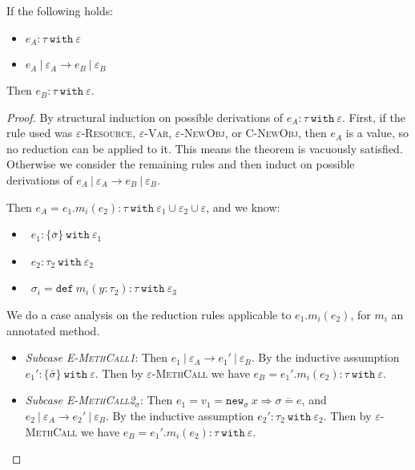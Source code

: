 \documentclass{llncs}
\newcommand{\keywadj}[1]{\mathtt{#1}}
\newcommand{\keyw}[1]{\keywadj{#1}~}
\newcommand{\pcase}[1][]{
  \if\relax\detokenize{#1}\relax
    \def\thiscase{}
  \else
    \def\thiscase{~#1}
  \fi
  \item
}
\begin{document}
\begin{theorem}[Preservation]
If the following holds:
\begin{itemize}
	\item $e_A : \tau~\keyw{with} \varepsilon$
	\item $e_A~|~\varepsilon_A \longrightarrow e_B~|~\varepsilon_B$
\end{itemize}

\noindent
Then $e_B : \tau~\keyw{with} \varepsilon$.
\end{theorem}

\begin{proof}
By structural induction on possible derivations of $e_A : \tau~\keyw{with} \varepsilon$. First, if the rule used was \textsc{$\varepsilon$-Resource}, \textsc{$\varepsilon$-Var}, \textsc{$\varepsilon$-NewObj}, or \textsc{C-NewObj}, then $e_A$ is a value, so no reduction can be applied to it. This means the theorem is vacuously satisfied. Otherwise we consider the remaining rules and then induct on possible derivations of $e_A~|~\varepsilon_A \longrightarrow e_B~|~\varepsilon_B$.

\begin{pcases}

\pcase[\textsc{$\varepsilon$-MethCall$_{\sigma}$}]
Then $e_A = e_1.m_i(e_2) : \tau~\keyw{with} \varepsilon_1 \cup \varepsilon_2 \cup \varepsilon$, and we know:
\begin{itemize}
	\item~$e_1  : \{ \overline \sigma \}~ \keyw{with} \varepsilon_1$
	\item~$e_2 : \tau_2~\keyw{with} \varepsilon_2$
	\item~$\sigma_i = \keyw{def} m_i(y : \tau_2) : \tau~ \keyw{with} \varepsilon_3$
\end{itemize}
We do a case analysis on the reduction rules applicable to $e_1.m_i(e_2)$, for $m_i$ an annotated method.


\begin{itemize}
	\item[] \textit{Subcase \textsc{E-MethCall1}}:
	Then $e_1~|~\varepsilon_A \rightarrow e_1'~|~\varepsilon_B$. By the inductive assumption $e_1' : \{ \bar \sigma \}~\keyw{with} \varepsilon$. Then by \textsc{$\varepsilon$-MethCall} we have $e_B = e_1'.m_i(e_2) : \tau~\keyw{with} \varepsilon$. \\
	
	\item[] \textit{Subcase \textsc{E-MethCall2$_{\sigma}$}}:
	Then $e_1 = v_1 = \keywadj{new}_{\sigma}~x \Rightarrow \overline{\sigma = e}$, and $e_2~|~\varepsilon_A \longrightarrow e_2'~|~\varepsilon_B$. By the inductive assumption $e_2' : \tau_2~\keyw{with} \varepsilon_2$. Then by \textsc{$\varepsilon$-MethCall} we have $e_B = e_1'.m_i(e_2) : \tau~\keyw{with} \varepsilon$. \\
	

\end{itemize}
\end{pcases}
\end{proof}
\end{document}
